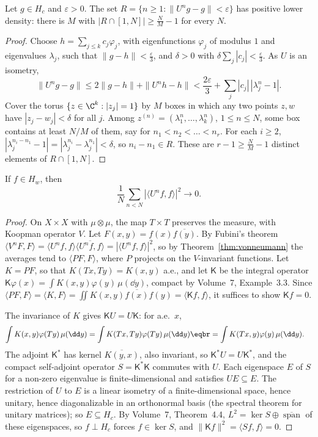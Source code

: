 \begin{lemma}\label{lem:almostperiodic}
Let $g\in H_c$ and $\varepsilon>0$. The set $R=\{n\ge1:\|U^ng-g\|<\varepsilon\}$ has positive lower density: there is $M$ with $|R\cap[1,N]|\ge\frac NM-1$ for every $N$.
\end{lemma}
\begin{proof}
Choose $h=\sum_{j\le k}c_j\varphi_j$, with eigenfunctions $\varphi_j$ of modulus $1$ and eigenvalues $\lambda_j$, such that $\|g-h\|<\frac\varepsilon3$, and $\delta>0$ with $\delta\sum_j|c_j|<\frac\varepsilon3$. As $U$ is an isometry,
\[
\|U^ng-g\|\le2\|g-h\|+\|U^nh-h\|<\frac{2\varepsilon}3+\sum_j|c_j|\,|\lambda_j^n-1|.
\]
Cover the torus $\{z\in\C^k:|z_j|=1\}$ by $M$ boxes in which any two points $z,w$ have $|z_j-w_j|<\delta$ for all $j$. Among $z^{(n)}=(\lambda_1^n,\dots,\lambda_k^n)$, $1\le n\le N$, some box contains at least $N/M$ of them, say for $n_1<n_2<\dots<n_r$.
For each $i\ge2$, $|\lambda_j^{n_i-n_1}-1|=|\lambda_j^{n_i}-\lambda_j^{n_1}|<\delta$, so $n_i-n_1\in R$. These are $r-1\ge\frac NM-1$ distinct elements of $R\cap[1,N]$.
\end{proof}

\begin{lemma}\label{lem:wm}
If $f\in H_w$, then
\[
\frac1N\sum_{n<N}|\langle U^nf,f\rangle|^2\longrightarrow0.
\]
\end{lemma}
\begin{proof}
On $X\times X$ with $\mu\otimes\mu$, the map $T\times T$ preserves the measure, with Koopman operator $V$. Let $F(x,y)=f(x)\overline{f(y)}$. By Fubini's theorem $\langle V^nF,F\rangle=\langle U^nf,f\rangle\overline{\langle U^nf,f\rangle}=|\langle U^nf,f\rangle|^2$, so by
Theorem~\ref{thm:vonneumann} the averages tend to $\langle PF,F\rangle$, where $P$ projects on the $V$-invariant functions. Let $K=PF$, so that $K(Tx,Ty)=K(x,y)$ a.e., and let $\mathsf K$ be the integral operator
$\mathsf K\varphi(x)=\int K(x,y)\varphi(y)\,\mu(\dd y)$, compact by Volume~7, Example~3.3. Since $\langle PF,F\rangle=\langle K,F\rangle=\iint K(x,y)\overline{f(x)}f(y)=\langle\mathsf Kf,f\rangle$, it suffices to show $\mathsf Kf=0$.

The invariance of $K$ gives $\mathsf KU=U\mathsf K$: for a.e.\ $x$,
\[
\begin{aligned}\int K(x,y)\varphi(Ty)\,\mu(\dd y)&=\int K(Tx,Ty)\varphi(Ty)\,\mu(\dd y)\eqbr=\int K(Tx,y)\varphi(y)\,\mu(\dd y).\end{aligned}
\]
The adjoint $\mathsf K^*$ has kernel $\overline{K(y,x)}$, also invariant,
so $\mathsf K^*U=U\mathsf K^*$, and the compact self-adjoint operator $S=\mathsf K^*\mathsf K$ commutes with $U$. Each eigenspace $E$ of $S$ for a non-zero eigenvalue is finite-dimensional and satisfies $UE\subseteq E$. The restriction of $U$ to $E$ is a linear
isometry of a finite-dimensional space, hence unitary, hence diagonalizable in an orthonormal basis (the spectral theorem for unitary matrices); so $E\subseteq H_c$. By Volume~7, Theorem~4.4, $L^2=\ker S\oplus\overline{\operatorname{span}}$ of these
eigenspaces, so $f\perp H_c$ forces $f\in\ker S$, and $\|\mathsf Kf\|^2=\langle Sf,f\rangle=0$.
\end{proof}

